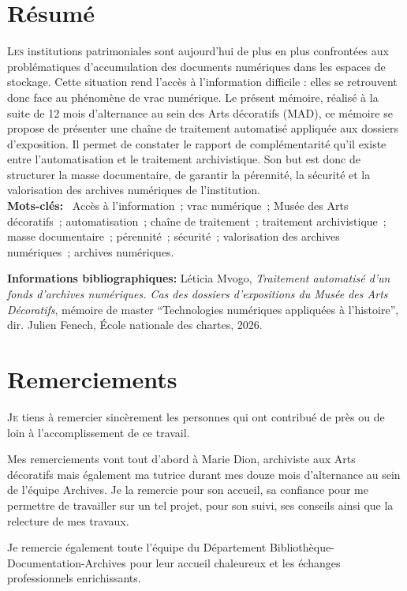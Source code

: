 \documentclass[12pt,twoside]{book}
\begin{document}
	\chapter{Résumé}
\medskip
	\lettrine{L}{es} institutions patrimoniales sont aujourd'hui de plus en plus confrontées aux problématiques d'accumulation des documents numériques dans les espaces de stockage. Cette situation rend l'accès à l'information difficile : elles se retrouvent donc face au phénomène de vrac numérique. Le présent mémoire, réalisé à la suite de 12 mois d'alternance au sein des Arts décoratifs (MAD), ce mémoire se propose de présenter une chaîne de traitement automatisé appliquée aux dossiers d'exposition. Il permet de constater le rapport de complémentarité qu'il existe entre l'automatisation et le traitement archivistique. Son but est donc de structurer la masse documentaire, de garantir la pérennité, la sécurité et la valorisation des archives numériques de l'institution. \\
	
	\textbf{Mots-clés:} ~Accès à l'information~; vrac numérique~; Musée des Arts décoratifs~; automatisation~; chaîne de traitement~; traitement archivistique~; masse documentaire~; pérennité~; sécurité~; valorisation des archives numériques~; archives numériques.
	
	\textbf{Informations bibliographiques:} Léticia Mvogo, \textit{Traitement automatisé d'un fonds d'archives numériques. Cas des dossiers d'expositions du Musée des Arts Décoratifs}, mémoire de master \enquote{Technologies numériques appliquées à l'histoire}, dir. Julien Fenech, École nationale des chartes, 2026.
	
		\newpage{\pagestyle{empty}\cleardoublepage}
	
	\chapter{Remerciements}
	
\lettrine{J}e tiens à remercier sincèrement les personnes qui ont contribué de près ou de loin à l'accomplissement de ce travail.

Mes remerciements vont tout d'abord à Marie Dion, archiviste aux Arts décoratifs mais également ma tutrice durant mes douze mois d'alternance au sein de l'équipe Archives. Je la remercie pour son accueil, sa confiance pour me permettre de travailler sur un tel projet, pour son suivi, ses conseils ainsi que la relecture de mes travaux. 

Je remercie également toute l'équipe du Département Bibliothèque-Documentation-Archives pour leur accueil chaleureux et les échanges professionnels enrichissants. 
\end{document}
